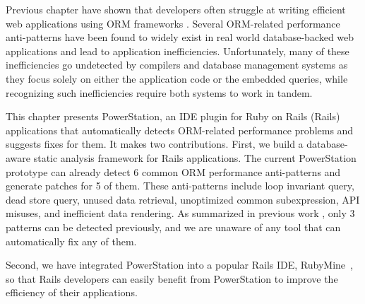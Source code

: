 
Previous chapter have shown that developers often struggle at writing efficient web applications
using ORM frameworks
\cite{yan:cikm17, junwen:icse2018, chen2016finding, cheung2013optimizing}. 
Several ORM-related performance anti-patterns have been found to widely exist 
in real world database-backed web applications and lead to application inefficiencies.
Unfortunately, many of these inefficiencies go undetected by compilers and database management systems as they focus solely on either the application code or the embedded queries, while recognizing such inefficiencies require both systems to work in tandem.

This chapter presents PowerStation, an IDE plugin for Ruby on Rails (Rails) applications that automatically detects ORM-related
performance problems and suggests fixes for them.
It makes two contributions.
First, we build a database-aware static analysis framework for Rails applications. 
The current PowerStation prototype can already detect 6 common
ORM performance anti-patterns and generate patches for 5 of them. 
These anti-patterns include loop invariant query, dead store query, unused data retrieval, unoptimized common subexpression, API misuses, and inefficient data rendering.
As summarized in previous work \cite{yan:cikm17, junwen:icse2018, chen2016finding}, only 3 patterns
can be detected previously, and we are unaware of any tool that can automatically fix any of them. %

Second, we have integrated PowerStation into %
a popular Rails IDE, RubyMine~\cite{RubyMine}, 
so that Rails developers can easily benefit from PowerStation to improve the efficiency of their applications.